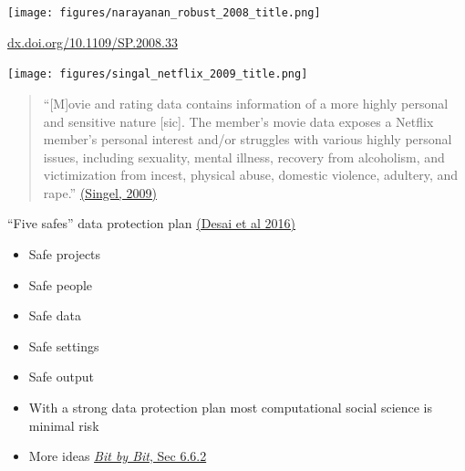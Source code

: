\documentclass{beamer}
\begin{document}
\begin{frame}

\begin{center}
\texttt{[image: figures/narayanan\_robust\_2008\_title.png]}
\end{center}
\vfill

\tiny{\url{dx.doi.org/10.1109/SP.2008.33}}
\end{frame}
\begin{frame}

\begin{center}
\texttt{[image: figures/singal\_netflix\_2009\_title.png]}
\end{center}


\begin{quote}
``[M]ovie and rating data contains information of a more highly personal and sensitive nature [sic]. The member's movie data exposes a Netflix member's personal interest and/or struggles with various highly personal issues, including sexuality, mental illness, recovery from alcoholism, and victimization from incest, physical abuse, domestic violence, adultery, and rape.''  \href{http://www.wired.com/2009/12/netflix-privacy-lawsuit/}{(Singel, 2009)}
\end{quote}

\end{frame}
\begin{frame}

``Five safes'' data protection plan \href{http://rsss.anu.edu.au/sites/default/files/Ritchie_5safes.pdf}{(Desai et al 2016)}
\begin{itemize}
\item Safe projects
\pause
\item Safe people
\pause
\item Safe data
\pause
\item Safe settings
\pause
\item Safe output
\end{itemize}

\end{frame}
\begin{frame}

\begin{itemize}
\item With a strong data protection plan most computational social science is minimal risk
\pause
\item More ideas \href{https://www.bitbybitbook.com/en/1st-ed/ethics/dilemmas/info-risk/}{\textit{Bit by Bit}, Sec 6.6.2}
\end{itemize}

\end{frame}
\end{document}
